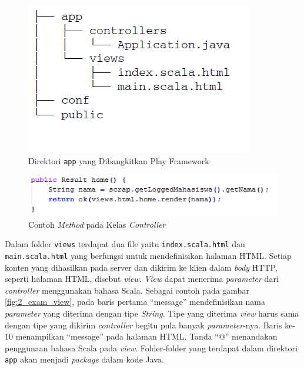 \documentclass[a4paper,twoside]{article}
\begin{document}
\begin{enumerate}
\begin{enumerate}
\begin{figure}[H]
	\centering
	\includegraphics[scale=0.5]{Gambar/app-dir}
	\caption{Direktori \texttt{app} yang Dibangkitkan Play Framework\cite{Leroux:2014}} 
	\label{fig:2_app_dir}
\end{figure}

\begin{figure}[H]
	\centering
	\includegraphics[scale=0.75]{Gambar/example-controller}
	\caption{Contoh \textit{Method} pada Kelas \textit{Controller}} 
	\label{fig:2_exam_ctrl}
\end{figure}

Dalam folder \texttt{views} terdapat dua file yaitu \texttt{index.scala.html} dan \texttt{main.scala.html} yang berfungsi untuk mendefinisikan halaman HTML. Setiap konten yang dihasilkan pada server dan dikirim ke klien dalam \textit{body} HTTP, seperti halaman HTML, disebut \textit{view}. \textit{View} dapat menerima \textit{parameter} dari \textit{controller} menggunakan bahasa Scala. Sebagai contoh pada gambar \ref{fig:2_exam_view}, pada baris pertama ``message'' mendefinisikan nama \textit{parameter} yang diterima dengan tipe \textit{String}. Tipe yang diterima \textit{view} harus sama dengan tipe yang dikirim \textit{controller} begitu pula banyak \textit{parameter}-nya. Baris ke-10 menampilkan ``message'' pada halaman HTML. Tanda ``@'' menandakan penggunaan bahasa Scala pada \textit{view}. Folder-folder yang terdapat dalam direktori \texttt{app} akan menjadi \textit{package} dalam kode Java.


\end{enumerate}
\end{enumerate}
\end{document}

